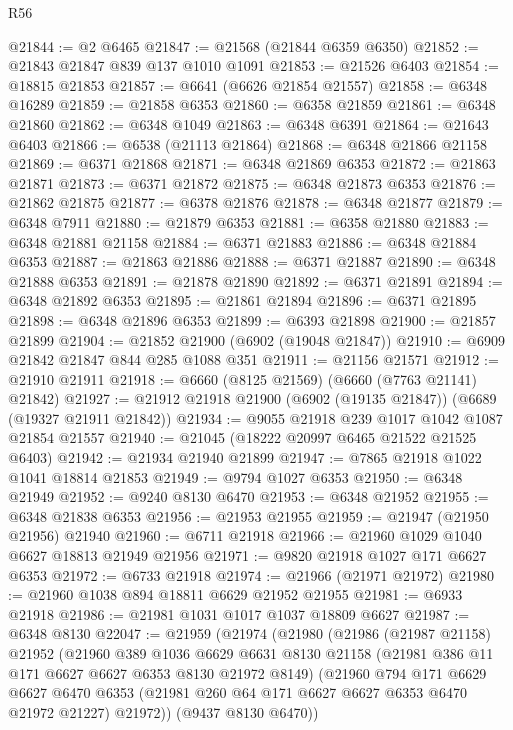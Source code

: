 \begin{lexlean}{R56}
\begin{coremodule}
@21844 := @2 @6465
@21847 := @21568 (@21844 @6359 @6350)
@21852 := @21843 @21847 @839 @137 @1010 @1091
@21853 := @21526 @6403
@21854 := @18815 @21853
@21857 := @6641 (@6626 @21854 @21557)
@21858 := @6348 @16289
@21859 := @21858 @6353
@21860 := @6358 @21859
@21861 := @6348 @21860
@21862 := @6348 @1049
@21863 := @6348 @6391
@21864 := @21643 @6403
@21866 := @6538 (@21113 @21864)
@21868 := @6348 @21866 @21158
@21869 := @6371 @21868
@21871 := @6348 @21869 @6353
@21872 := @21863 @21871
@21873 := @6371 @21872
@21875 := @6348 @21873 @6353
@21876 := @21862 @21875
@21877 := @6378 @21876
@21878 := @6348 @21877
@21879 := @6348 @7911
@21880 := @21879 @6353
@21881 := @6358 @21880
@21883 := @6348 @21881 @21158
@21884 := @6371 @21883
@21886 := @6348 @21884 @6353
@21887 := @21863 @21886
@21888 := @6371 @21887
@21890 := @6348 @21888 @6353
@21891 := @21878 @21890
@21892 := @6371 @21891
@21894 := @6348 @21892 @6353
@21895 := @21861 @21894
@21896 := @6371 @21895
@21898 := @6348 @21896 @6353
@21899 := @6393 @21898
@21900 := @21857 @21899
@21904 := @21852 @21900 (@6902 (@19048 @21847))
@21910 := @6909 @21842 @21847 @844 @285 @1088 @351
@21911 := @21156 @21571
@21912 := @21910 @21911
@21918 := @6660 (@8125 @21569) (@6660 (@7763 @21141) @21842)
@21927 := @21912 @21918 @21900 (@6902 (@19135 @21847)) (@6689 (@19327 @21911 @21842))
@21934 := @9055 @21918 @239 @1017 @1042 @1087 @21854 @21557
@21940 := @21045 (@18222 @20997 @6465 @21522 @21525 @6403)
@21942 := @21934 @21940 @21899
@21947 := @7865 @21918 @1022 @1041 @18814 @21853
@21949 := @9794 @1027 @6353
@21950 := @6348 @21949
@21952 := @9240 @8130 @6470
@21953 := @6348 @21952
@21955 := @6348 @21838 @6353
@21956 := @21953 @21955
@21959 := @21947 (@21950 @21956) @21940
@21960 := @6711 @21918
@21966 := @21960 @1029 @1040 @6627 @18813 @21949 @21956
@21971 := @9820 @21918 @1027 @171 @6627 @6353
@21972 := @6733 @21918
@21974 := @21966 (@21971 @21972)
@21980 := @21960 @1038 @894 @18811 @6629 @21952 @21955
@21981 := @6933 @21918
@21986 := @21981 @1031 @1017 @1037 @18809 @6627
@21987 := @6348 @8130
@22047 := @21959
    (@21974
      (@21980
        (@21986
          (@21987 @21158)
          @21952
          (@21960
            @389
            @1036
            @6629
            @6631
            @8130
            @21158
            (@21981 @386 @11 @171 @6627 @6627 @6353 @8130 @21972 @8149)
            (@21960
              @794
              @171
              @6629
              @6627
              @6470
              @6353
              (@21981 @260 @64 @171 @6627 @6627 @6353 @6470 @21972 @21227)
              @21972))
          (@9437 @8130 @6470))

\end{coremodule}
\end{lexlean}
